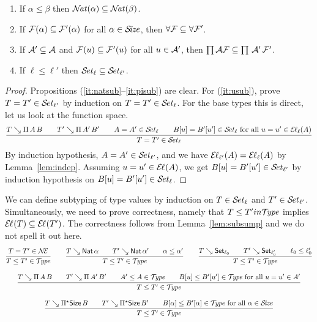 \documentclass[acmlarge,review,anonymous]{acmart}\settopmatter{printfolios=true}
\begin{document}
\begin{lemma}[Subsumption]
\label{lem:subsump} \hfill
\begin{enumerate}
\item \label{it:natsub} If $\alpha \leq \beta$ then $\NAT(\alpha) \subseteq \NAT(\beta)$.
\item \label{it:allsub} If $\F(\alpha) \subseteq \F'(\alpha)$ for all $\alpha \in \SIZE$, then $\FORALL \F \subseteq \FORALL \F'$.
\item \label{it:pisub}  If $\A' \subseteq \A$ and $\F(u) \subseteq \F'(u)$ for all $u \in \A'$, then $\PIAF \subseteq \PI\,\A'\,\F'$.
\item \label{it:usub}  If $\ell \leq \ell'$ then $\SET[\ell] \subseteq \SET[\ell']$.
\end{enumerate}
\end{lemma}
\begin{proof}
  Propositions (\ref{it:natsub}--\ref{it:pisub}) are clear.
  For (\ref{it:usub}), prove $T = T' \in \SET[\ell']$ by induction on $T = T' \in \SET[\ell]$.
  For the base types this is direct, let us look at the function space.
\[
  \rul{T \evalsto \piT A B \qquad
      T' \evalsto \piT{A'}{B'} \qquad
      A = A' \in \SET[\ell] \qquad
      B[u] = B'[u'] \in \SET[\ell] \mforall u = u' \in \EL[\ell](A)
    }{T = T' \in \SET[\ell]}
\]
  By induction hypothesis, $A = A' \in \SET[\ell']$, and we have $\EL[\ell'](A) = \EL[\ell](A)$ by Lemma~\ref{lem:indep}.  Assuming $u = u' \in \EL(A)$, we get $B[u] = B'[u'] \in \SET[\ell']$ by induction hypothesis on $B[u] = B'[u'] \in \SET[\ell]$.
\end{proof}
We can define subtyping of type values  by induction on $T \in \SET[\ell]$ and $T' \in \SET[\ell']$.
Simultaneously, we need to prove correctness, namely that $T \leq T' in \TYPE$ implies $\EL(T) \subseteq \EL(T')$.  The correctness follows from Lemma~\ref{lem:subsump} and we do not spell it out here.
\begin{gather*}
  \ru{T = T' \in \NEE
    }{T \leq T' \in \TYPE}
\qquad
  \ru{T \evalsto \Nat \alpha \qquad
      T' \evalsto \Nat \alpha' \qquad
      \alpha \leq \alpha'
    }{T \leq T' \in \TYPE}
\qquad
  \ru{T \evalsto \Set[\ell_0] \qquad
      T' \evalsto \Set[\ell_0'] \qquad
      \ell_0 \leq \ell_0'
    }{T \leq T' \in \TYPE}
\\[2ex]
  \ru{T \evalsto \piT A B \qquad
      T' \evalsto \piT {A'}{B'} \qquad
      A' \leq A \in \TYPE \qquad
      B[u] \leq B'[u'] \in \TYPE \mforall u = u' \in A'
    }{T \leq T' \in \TYPE}
\\[2ex]
  \ru{T \evalsto \epiT \Size B \qquad
      T' \evalsto \epiT {\Size}{B'} \qquad
      B[\alpha] \leq B'[\alpha] \in \TYPE \mforall \alpha \in \SIZE
    }{T \leq T' \in \TYPE}
\end{gather*}
\end{document}
